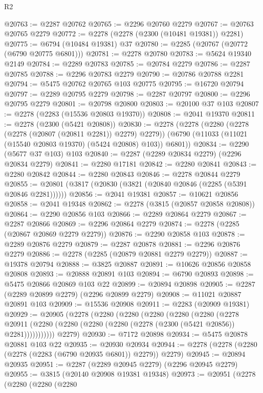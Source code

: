 \begin{lexlean}{R2}
\begin{coremodule}
@20763 := @2287 @20762
@20765 := @2296 @20760 @2279
@20767 := @20763 @20765 @2279
@20772 := @2278 (@2278 (@2300 (@10481 @19381)) @2281)
@20775 := @6794 (@10484 @19381) @37
@20780 := @2285 (@20767 (@20772 (@6790 @20775 @6801)))
@20781 := @2278 @20780
@20783 := @5624 @19340 @2149
@20784 := @2289 @20783
@20785 := @20784 @2279
@20786 := @2287 @20785
@20788 := @2296 @20783 @2279
@20790 := @20786 @20788 @2281
@20794 := @5475 @20762 @20765 @103 @20775
@20795 := @16720 @20794
@20797 := @2289 @20795 @2279
@20798 := @2287 @20797
@20800 := @2296 @20795 @2279
@20801 := @20798 @20800
@20803 := @20100 @37 @103
@20807 := @2278 (@2283 (@15536 @20803 @19370))
@20808 := @2041 @19370
@20811 := @2278 (@2300 (@5421 @20808))
@20830 := @2278
    (@2278
      (@2280 (@2278 (@2278 (@20807 (@20811 @2281)) @2279) @2279))
      (@6790 (@11033 (@11021 (@15540 @20803 @19370) (@5424 @20808) @103)) @6801))
@20834 := @2290 (@5677 @37 @103) @103
@20840 := @2287 (@2289 @20834 @2279) (@2296 @20834 @2279)
@20841 := @2280 @17181
@20842 := @2280 @20841
@20843 := @2280 @20842
@20844 := @2280 @20843
@20846 := @2278 @20844 @2279
@20855 := @20801 (@3817 (@20830 (@3821 (@20840 @20846 (@2285 (@5391 @20846 @2281))))))
@20856 := @2041 @19381
@20857 := @10621 @20856
@20858 := @2041 @19348
@20862 := @2278 (@3815 (@20857 @20858 @20808))
@20864 := @2290 @20856 @103
@20866 := @2289 @20864 @2279
@20867 := @2287 @20866
@20869 := @2296 @20864 @2279
@20874 := @2278 (@2285 (@20867 @20869 @2279 @2279))
@20876 := @2290 @20858 @103
@20878 := @2289 @20876 @2279
@20879 := @2287 @20878
@20881 := @2296 @20876 @2279
@20886 := @2278 (@2285 (@20879 @20881 @2279 @2279))
@20887 := @19378 @20794
@20888 := @3825 @20887
@20891 := @10626 @20856 @20858 @20808
@20893 := @20888 @20891 @103
@20894 := @6790 @20893
@20898 := @5475 @20866 @20869 @103 @22
@20899 := @20894 @20898
@20905 := @2287 (@2289 @20899 @2279) (@2296 @20899 @2279)
@20908 := @11021 @20887 @20891 @103
@20909 := @15536 @20908
@20911 := @2283 (@20909 @19381)
@20929 := @20905
    (@2278
      (@2280
        (@2280
          (@2280
            (@2280
              (@2280
                (@2278
                  @20911
                  (@2280 (@2280 (@2280 (@2280 (@2278 (@2300 (@5421 @20856)) @2281)))))))))))
      @2279)
@20930 := @7172 @20898
@20934 := @5475 @20878 @20881 @103 @22
@20935 := @20930 @20934
@20944 := @2278 (@2278 (@2280 (@2278 (@2283 (@6790 @20935 @6801)) @2279)) @2279)
@20945 := @20894 @20935
@20951 := @2287 (@2289 @20945 @2279) (@2296 @20945 @2279)
@20955 := @3815 (@20140 @20908 @19381 @19348)
@20973 := @20951
    (@2278
      (@2280
        (@2280
          (@2280

\end{coremodule}
\end{lexlean}
